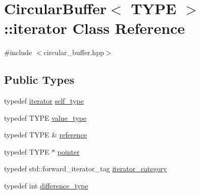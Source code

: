 \hypertarget{classCircularBuffer_1_1iterator}{}\section{Circular\+Buffer$<$ T\+Y\+PE $>$\+:\+:iterator Class Reference}
\label{classCircularBuffer_1_1iterator}


{\ttfamily \#include $<$circular\+\_\+buffer.\+hpp$>$}

\subsection*{Public Types}
\begin{DoxyCompactItemize}
\item 
typedef \hyperlink{classCircularBuffer_1_1iterator}{iterator} \hyperlink{classCircularBuffer_1_1iterator_a7dae9b5926088a3ef46a8a654e383605}{self\+\_\+type}
\item 
typedef T\+Y\+PE \hyperlink{classCircularBuffer_1_1iterator_accfd2e9138e9e6841ef4f25579cf02bb}{value\+\_\+type}
\item 
typedef T\+Y\+PE \& \hyperlink{classCircularBuffer_1_1iterator_a9aa4665328da6f468a188ae36c6b00a3}{reference}
\item 
typedef T\+Y\+PE $\ast$ \hyperlink{classCircularBuffer_1_1iterator_a35ab71bca3df750e955de46c222b8ee3}{pointer}
\item 
typedef std\+::forward\+\_\+iterator\+\_\+tag \hyperlink{classCircularBuffer_1_1iterator_a806f5db087c9419cb1f81c030f39267c}{iterator\+\_\+category}
\item 
typedef int \hyperlink{classCircularBuffer_1_1iterator_a58a96b782e1e3ccef78445b819e8011a}{difference\+\_\+type}
\end{DoxyCompactItemize}
